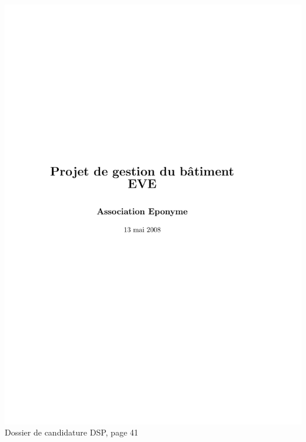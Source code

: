 \includegraphics[scale=0.85,trim=20mm 20mm 20mm 20mm,clip,page=41]{annexes/candidature_dsp.pdf} \\
Dossier de candidature DSP, page 41
\newpage
